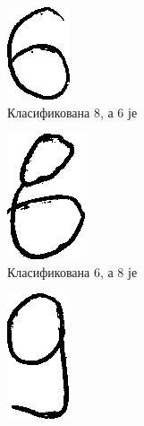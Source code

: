 \begin{figure}[htb!]\caption{Неправилна класификација}
\begin{subfigure}{.3\textwidth}
\centering
\includegraphics[width=.4\linewidth]{pictures/1/BadClass6}
\caption{Класификована 8, а 6 је}\label{pic:goodClass6}
\end{subfigure}
\begin{subfigure}{.3\textwidth}
\centering
\includegraphics[width=.4\linewidth]{pictures/1/BadClass8}
\caption{Класификована 6, а 8 је}\label{pic:goodClass8}
\end{subfigure}
\begin{subfigure}{.3\textwidth}
\centering
\includegraphics[width=.4\linewidth]{pictures/1/BadClass9}

\end{subfigure}
\end{figure}
